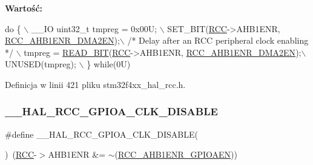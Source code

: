 {\bfseries Wartość\+:}
\begin{DoxyCode}
\textcolor{keywordflow}{do} \{ \(\backslash\)
                                        \_\_IO uint32\_t tmpreg = 0x00U; \(\backslash\)
                                        SET\_BIT(\hyperlink{group___peripheral__declaration_ga74944438a086975793d26ae48d5882d4}{RCC}->AHB1ENR, 
      \hyperlink{group___peripheral___registers___bits___definition_ga664a5d572a39a0c084e4ee7c1cf7df0d}{RCC\_AHB1ENR\_DMA2EN});\(\backslash\)
                                        \textcolor{comment}{/* Delay after an RCC peripheral clock enabling */} \(\backslash\)
                                        tmpreg = \hyperlink{group___exported__macro_ga822bb1bb9710d5f2fa6396b84e583c33}{READ\_BIT}(\hyperlink{group___peripheral__declaration_ga74944438a086975793d26ae48d5882d4}{RCC}->AHB1ENR, 
      \hyperlink{group___peripheral___registers___bits___definition_ga664a5d572a39a0c084e4ee7c1cf7df0d}{RCC\_AHB1ENR\_DMA2EN});\(\backslash\)
                                        UNUSED(tmpreg); \(\backslash\)
                                          \} \textcolor{keywordflow}{while}(0U)
\end{DoxyCode}


Definicja w linii 421 pliku stm32f4xx\+\_\+hal\+\_\+rcc.\+h.

\mbox{\label{group___r_c_c___a_h_b1___clock___enable___disable_ga7083e491e6a1e165d064d199304bd2f0}} 
\subsubsection{\texorpdfstring{\+\_\+\+\_\+\+H\+A\+L\+\_\+\+R\+C\+C\+\_\+\+G\+P\+I\+O\+A\+\_\+\+C\+L\+K\+\_\+\+D\+I\+S\+A\+B\+LE}{\_\_HAL\_RCC\_GPIOA\_CLK\_DISABLE}}
{\footnotesize\ttfamily \#define \+\_\+\+\_\+\+H\+A\+L\+\_\+\+R\+C\+C\+\_\+\+G\+P\+I\+O\+A\+\_\+\+C\+L\+K\+\_\+\+D\+I\+S\+A\+B\+LE(\begin{DoxyParamCaption}{ }\end{DoxyParamCaption})~(\hyperlink{group___peripheral__declaration_ga74944438a086975793d26ae48d5882d4}{R\+CC}-\/$>$A\+H\+B1\+E\+NR \&= $\sim$(\hyperlink{group___peripheral___registers___bits___definition_ga6ff46fb3b30fc6792e4fd18fcb0941b5}{R\+C\+C\+\_\+\+A\+H\+B1\+E\+N\+R\+\_\+\+G\+P\+I\+O\+A\+EN}))}



